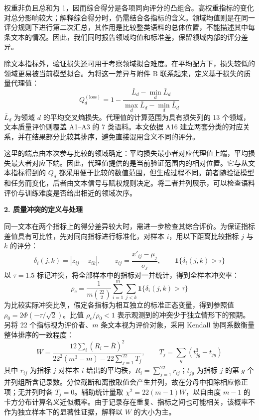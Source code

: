 权重非负且总和为 1，因而综合得分是各项同向评分的凸组合。高权重指标的变化对总分影响较大；解释综合得分时，仍需结合各指标的含义。领域均值则是在同一评分规则下进行第二次汇总，其作用是比较整类语料的总体位置，不能描述其中每条文本的情况。因此，我们同时报告领域均值和标准差，保留领域内部的评分差异。

除文本指标外，验证损失还可用于考察领域拟合难度。在平均配方下，损失较低的领域更易被当前模型拟合。为将这一差异与附件 B 联系起来，定义基于损失的质量代理值：
\begin{equation}
    Q_d^{(\text{loss})}=1-\frac{\bar L_d-\min_d \bar L_d}{\max_d \bar L_d-\min_d \bar L_d}
\end{equation}
$\bar L_d$ 为领域 $d$ 的平均交叉熵损失。代理值的计算范围为具有损失列的 13 个领域，文本质量评价则覆盖 A1--A3 的 7 类语料。本文依据 A16 建立两套分类的对应关系，并在结果部分比较其排序，避免直接混用含义不同的评分。

这里的端点由本次参与比较的领域确定：平均损失最小者对应代理值上端，平均损失最大者对应下端。因此，代理值提供的是当前验证范围内的相对位置。它与从文本指标得到的 $Q_d$ 都采用便于比较的数值范围，但生成过程不同。前者随验证模型和任务而变化，后者由文本信号与赋权规则决定。将二者并列展示，可以检查语料评价与训练难度是否给出相近的领域次序。

\textbf{2. 质量冲突的定义与处理}\par\nopagebreak[4]

同一文本在两个指标上的得分差异较大时，需进一步检查其综合评价。为保证指标差值具有可比性，先对同向指标进行标准化，对样本 $i$，用以下距离比较指标 $j$ 与 $k$ 的评分：
\begin{equation}
    \delta_i(j,k) = \left| z_{ij} - z_{ik} \right|,\qquad z_{ij}=\frac{x'_{ij}-\mu_j}{\sigma_j},\qquad
    \mathbf 1\{\delta_i(j,k)>\tau\}
\end{equation}
以 $\tau=1.5$ 标记冲突，将全部样本中的指标对一并统计，得到全样本冲突率：
\begin{equation}
    \rho_c = \frac{1}{m\binom{22}{2}}\sum_{i=1}^{m}\sum_{j<k}\mathbf 1\{\delta_i(j,k)>\tau\}
\end{equation}
为比较实际冲突比例，假定各指标为相互独立的标准正态变量，得到参照值 $\rho_0=2\Phi(-\tau/\sqrt2)$。比值 $\rho_c/\rho_0<1$ 表示观测到的冲突少于独立情形下的预期。另将 22 个指标视为评价者、$m$ 条文本视为评价对象，采用 Kendall 协同系数\cite{kendall1939}衡量整体排序的一致程度：
\begin{equation}
    W = \frac{12\sum_i (R_i-\bar R)^2}{22^2(m^3-m)-22\sum_{j=1}^{22}T_j},\qquad
    T_j=\sum_g(t_{jg}^3-t_{jg})
\end{equation}
其中 $r_{ij}$ 为指标 $j$ 对样本 $i$ 给出的平均秩，$R_i=\sum_{j=1}^{22}r_{ij}$；$t_{jg}$ 为指标 $j$ 的第 $g$ 个并列组所含记录数。分位截断和离散取值会产生并列，故在分母中扣除相应修正项；无并列时各 $T_j=0$。辅助统计量取 $\chi^2=22(m-1)W$，以自由度 $m-1$ 的卡方分布计算名义近似概率。由于记录存在重复、指标之间也可能相关，该概率不作为独立样本下的显著性证据，解释以 $W$ 的大小为主。

